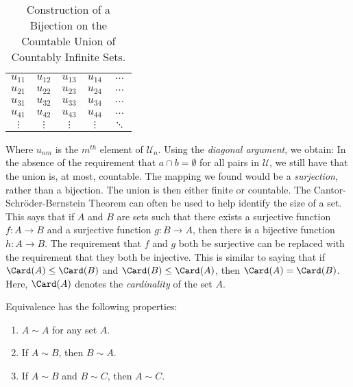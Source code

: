     \begin{table}[H]
        \captionsetup{type=table}
        \centering
        \begin{tabular}{ccccc}
            $u_{11}$&$u_{12}$&$u_{13}$
            &$u_{14}$&$\hdots$\\
            $u_{21}$&$u_{22}$&$u_{23}$
            &$u_{24}$&$\hdots$\\
            $u_{31}$&$u_{32}$&$u_{33}$
            &$u_{34}$&$\hdots$\\
            $u_{41}$&$u_{42}$&$u_{43}$
            &$u_{44}$&$\hdots$\\
            $\vdots$&$\vdots$&$\vdots$
            &$\vdots$&$\ddots$
        \end{tabular}
        \caption{Construction of a Bijection on the
                 Countable Union of Countably Infinite
                 Sets.}
        \label{table:Countable_Union_of_Countable}
    \end{table}
    Where $u_{nm}$ is the $m^{th}$ element of
    $\mathcal{U}_{n}$.
    Using the \textit{diagonal argument},
    we obtain:
    In the absence of the requirement that
    $a\cap{b}=\emptyset$ for all pairs in $\mathcal{U}$,
    we still have that the union is, at most, countable.
    The mapping we found would be a
    \textit{surjection}, rather than a bijection.
    The union is then either finite or countable. The
    Cantor-Schr\"{o}der-Bernstein Theorem can often be
    used to help identify the size of a set. This says
    that if $A$ and $B$ are sets such that there exists
    a surjective function $f:A\rightarrow{B}$ and a
    surjective function $g:B\rightarrow{A}$, then there
    is a bijective function $h:A\rightarrow{B}$. The
    requirement that $f$ and $g$ both be surjective
    can be replaced with the requirement that they both
    be injective. This is similar to saying that if
    $\Card(A)\leq\Card(B)$ and $\Card(B)\leq\Card(A)$,
    then $\Card(A)=\Card(B)$. Here, $\Card(A)$ denotes
    the \textit{cardinality} of the set $A$.
    \begin{theorem}
        Equivalence has the following properties:
        \begin{enumerate}
            \item   $A\sim A$ for any set $A$.
            \item   If $A\sim B$, then $B\sim A$.
            \item   If $A\sim B$ and $B\sim C$, then $A\sim C$.
        \end{enumerate}
    \end{theorem}
